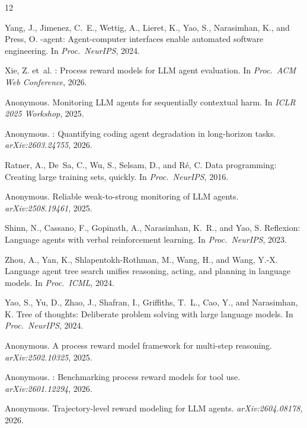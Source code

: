 \documentclass[11pt,a4paper]{article}
\begin{document}
\begin{thebibliography}{12}

Yang, J., Jimenez, C.~E., Wettig, A., Lieret, K., Yao, S., Narasimhan, K., and Press, O.
-agent: Agent-computer interfaces enable automated software engineering.
\newblock In \emph{Proc.\ NeurIPS}, 2024.

Xie, Z. et~al.
: Process reward models for {LLM} agent evaluation.
\newblock In \emph{Proc.\ ACM Web Conference}, 2026.

{Anonymous}.
\newblock Monitoring {LLM} agents for sequentially contextual harm.
\newblock In \emph{ICLR 2025 Workshop}, 2025.

{Anonymous}.
: Quantifying coding agent degradation in long-horizon tasks.
\newblock \emph{arXiv:2603.24755}, 2026.

Ratner, A., De~Sa, C., Wu, S., Selsam, D., and R{\'e}, C.
\newblock Data programming: Creating large training sets, quickly.
\newblock In \emph{Proc.\ NeurIPS}, 2016.

{Anonymous}.
\newblock Reliable weak-to-strong monitoring of {LLM} agents.
\newblock \emph{arXiv:2508.19461}, 2025.

Shinn, N., Cassano, F., Gopinath, A., Narasimhan, K.~R., and Yao, S.
\newblock Reflexion: Language agents with verbal reinforcement learning.
\newblock In \emph{Proc.\ NeurIPS}, 2023.

Zhou, A., Yan, K., Shlapentokh-Rothman, M., Wang, H., and Wang, Y.-X.
\newblock Language agent tree search unifies reasoning, acting, and planning in language models.
\newblock In \emph{Proc.\ ICML}, 2024.

Yao, S., Yu, D., Zhao, J., Shafran, I., Griffiths, T.~L., Cao, Y., and Narasimhan, K.
\newblock Tree of thoughts: Deliberate problem solving with large language models.
\newblock In \emph{Proc.\ NeurIPS}, 2024.

{Anonymous}.
\newblock A process reward model framework for multi-step reasoning.
\newblock \emph{arXiv:2502.10325}, 2025.

{Anonymous}.
: Benchmarking process reward models for tool use.
\newblock \emph{arXiv:2601.12294}, 2026.

{Anonymous}.
\newblock Trajectory-level reward modeling for {LLM} agents.
\newblock \emph{arXiv:2604.08178}, 2026.

\end{thebibliography}
\end{document}
